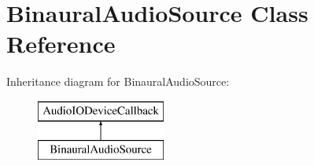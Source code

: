 \hypertarget{class_binaural_audio_source}{}\section{Binaural\+Audio\+Source Class Reference}
\label{class_binaural_audio_source}
Inheritance diagram for Binaural\+Audio\+Source\+:\begin{figure}[H]
\begin{center}
\leavevmode
\includegraphics[height=2.000000cm]{class_binaural_audio_source}
\end{center}
\end{figure}
